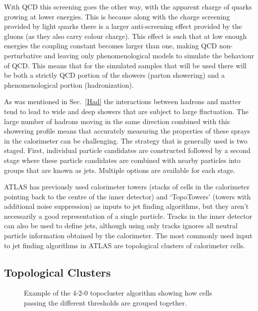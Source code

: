 With QCD this screening goes the other way, with the apparent charge of quarks growing at lower energies.  
This is because along with the charge screening provided by light quarks there is a larger anti-screening effect provided by the gluons (as they also carry colour charge).  
This effect is such that at low enough energies the coupling constant becomes larger than one, making QCD non-perturbative and leaving only phenomenological models to simulate the behaviour of QCD.  
This means that for the simulated samples that will be used there will be both a strictly QCD portion of the showers (parton showering) and a phenomenological portion (hadronization).  

As was mentioned in Sec.~\ref{Had} the interactions between hadrons and matter tend to lead to wide and deep showers that are subject to large fluctuation.  
The large number of hadrons moving in the same direction combined with this showering profile means that accurately measuring the properties of these sprays in the calorimeter can be challenging.  
The strategy that is generally used is two staged.  
First, individual particle candidates are constructed followed by a second stage where these particle candidates are combined with nearby particles into groups that are known as jets.  
Multiple options are available for each stage.  

ATLAS has previously used calorimeter towers (stacks of cells in the calorimeter pointing back to the centre of the inner detector) and `TopoTowers' (towers with additional noise suppression) as inputs to jet finding algorithms, but they aren't necessarily a good representation of a single particle.  
Tracks in the inner detector can also be used to define jets, although using only tracks ignores all neutral particle information obtained by the calorimeter.  
The most commonly used input to jet finding algorithms in ATLAS are topological clusters of calorimeter cells.  
 
\subsection{Topological Clusters}

\begin{figure}[!ht]
  \begin{center}
  \end{center}
  \caption[Topoclustering diagram]
  {\small Example of the 4-2-0 topocluster algorithm showing how cells passing the different thresholds are grouped together.  }
\end{figure}

